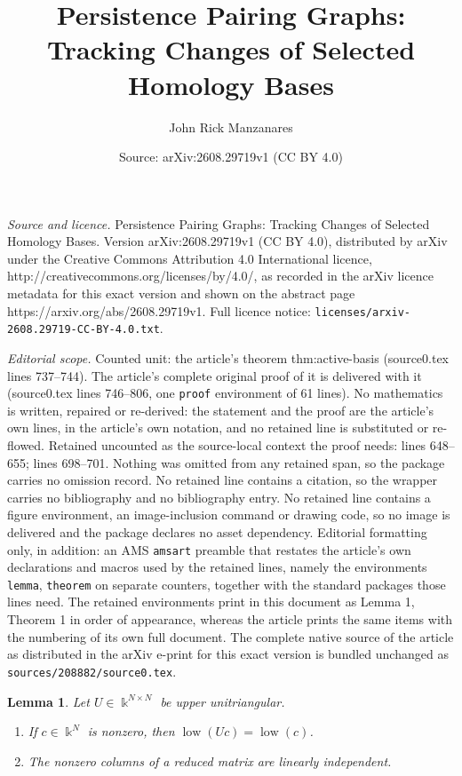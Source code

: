 \documentclass[10pt,a4paper]{amsart}
\title{Persistence Pairing Graphs: Tracking Changes of Selected Homology Bases}
\author{John Rick Manzanares}
\date{Source: arXiv:2608.29719v1 (CC BY 4.0)}
\newtheorem{lemma}{Lemma}
\begin{document}
\maketitle

\noindent\emph{Source and licence.} Persistence Pairing Graphs: Tracking Changes of Selected Homology Bases. Version arXiv:2608.29719v1 (CC BY 4.0), distributed by arXiv under the Creative Commons Attribution 4.0 International licence, http://creativecommons.org/licenses/by/4.0/, as recorded in the arXiv licence metadata for this exact version and shown on the abstract page https://arxiv.org/abs/2608.29719v1. Full licence notice: \texttt{licenses/arxiv-2608.29719-CC-BY-4.0.txt}.\par\smallskip

\noindent\textit{Editorial scope.} Counted unit: the article's theorem thm:active-basis (source0.tex lines 737--744). The article's complete original proof of it is delivered with it (source0.tex lines 746--806, one \texttt{proof} environment of 61 lines). No mathematics is written, repaired or re-derived: the statement and the proof are the article's own lines, in the article's own notation, and no retained line is substituted or re-flowed.  Retained uncounted as the source-local context the proof needs: lines 648--655; lines 698--701.  Nothing was omitted from any retained span, so the package carries no omission record.  No retained line contains a citation, so the wrapper carries no bibliography and no bibliography entry.  No retained line contains a figure environment, an image-inclusion command or drawing code, so no image is delivered and the package declares no asset dependency.  Editorial formatting only, in addition: an AMS \texttt{amsart} preamble that restates the article's own declarations and macros used by the retained lines, namely the environments \texttt{lemma}, \texttt{theorem} on separate counters, together with the standard packages those lines need.  The retained environments print in this document as Lemma 1, Theorem 1 in order of appearance, whereas the article prints the same items with the numbering of its own full document.  The complete native source of the article as distributed in the arXiv e-print for this exact version is bundled unchanged as \texttt{sources/208882/source0.tex}.
\begin{lemma}
\label{lem:reduced-matrix-facts}
Let $U\in\Bbbk^{N\times N}$ be upper unitriangular.
\begin{enumerate}
\item If $c\in\Bbbk^N$ is nonzero, then $\operatorname{low}(Uc)=\operatorname{low}(c)$.
\item The nonzero columns of a reduced matrix are linearly independent.
\end{enumerate}
\end{lemma}
\end{document}
